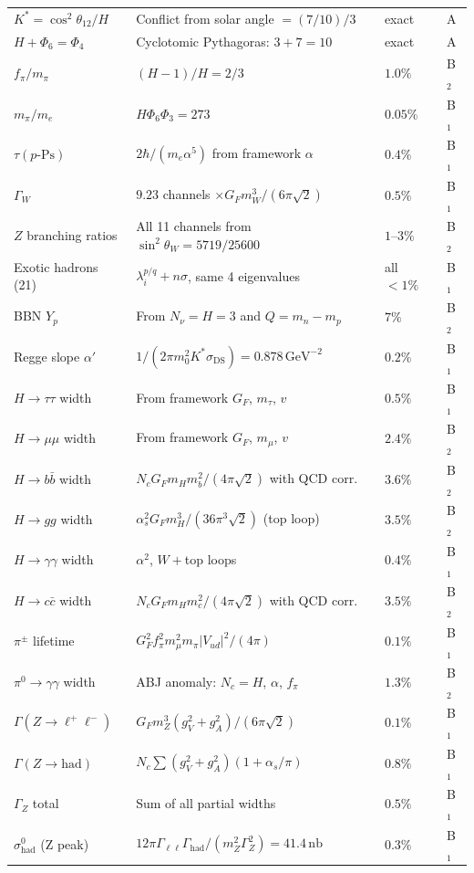 \documentclass[11pt,a4paper]{article}
\theoremstyle{definition}
\theoremstyle{remark}
\begin{document}
\begin{longtable}{p{3.8cm}p{7.2cm}p{3.0cm}l}
$K^*=\cos^2\theta_{12}/H$ & Conflict from solar angle $=(7/10)/3$ & exact & A \\
$H+\Phi_6=\Phi_4$ & Cyclotomic Pythagoras: $3+7=10$ & exact & A \\
$f_\pi/m_\pi$ & $(H-1)/H=2/3$ & $1.0\%$ & B$_2$ \\
$m_\pi/m_e$ & $H\Phi_6\Phi_3=273$ & $0.05\%$ & B$_1$ \\
$\tau(p\text{-Ps})$ & $2\hbar/(m_e\alpha^5)$ from framework $\alpha$ & $0.4\%$ & B$_1$ \\
$\Gamma_W$ & $9.23$ channels $\times G_Fm_W^3/(6\pi\sqrt{2})$ & $0.5\%$ & B$_1$ \\
$Z$ branching ratios & All 11 channels from $\sin^2\theta_W=5719/25600$ & $1$--$3\%$ & B$_2$ \\
Exotic hadrons (21) & $\lambda_i^{p/q}+n\sigma$, same 4 eigenvalues & all ${<}1\%$ & B$_1$ \\
BBN $Y_p$ & From $N_\nu=H=3$ and $Q=m_n-m_p$ & $7\%$ & B$_2$ \\
Regge slope $\alpha'$ & $1/(2\pi m_0^2 K^*\sigma_{\mathrm{DS}})=0.878\,\mathrm{GeV}^{-2}$ & $0.2\%$ & B$_1$ \\
$H\to\tau\tau$ width & From framework $G_F$, $m_\tau$, $v$ & $0.5\%$ & B$_1$ \\
$H\to\mu\mu$ width & From framework $G_F$, $m_\mu$, $v$ & $2.4\%$ & B$_2$ \\
$H\to b\bar{b}$ width & $N_c G_F m_H m_b^2/(4\pi\sqrt{2})$ with QCD corr. & $3.6\%$ & B$_2$ \\
$H\to gg$ width & $\alpha_s^2 G_F m_H^3/(36\pi^3\sqrt{2})$ (top loop) & $3.5\%$ & B$_2$ \\
$H\to\gamma\gamma$ width & $\alpha^2$, $W+$top loops & $0.4\%$ & B$_1$ \\
$H\to c\bar{c}$ width & $N_c G_F m_H m_c^2/(4\pi\sqrt{2})$ with QCD corr. & $3.5\%$ & B$_2$ \\
$\pi^\pm$ lifetime & $G_F^2 f_\pi^2 m_\mu^2 m_\pi |V_{ud}|^2/(4\pi)$ & $0.1\%$ & B$_1$ \\
$\pi^0\to\gamma\gamma$ width & ABJ anomaly: $N_c=H$, $\alpha$, $f_\pi$ & $1.3\%$ & B$_2$ \\
$\Gamma(Z\to\ell^+\ell^-)$ & $G_F m_Z^3(g_V^2+g_A^2)/(6\pi\sqrt{2})$ & $0.1\%$ & B$_1$ \\
$\Gamma(Z\to\mathrm{had})$ & $N_c\sum(g_V^2+g_A^2)(1+\alpha_s/\pi)$ & $0.8\%$ & B$_1$ \\
$\Gamma_Z$ total & Sum of all partial widths & $0.5\%$ & B$_1$ \\
$\sigma^0_\mathrm{had}$ (Z peak) & $12\pi\Gamma_{\ell\ell}\Gamma_\mathrm{had}/(m_Z^2\Gamma_Z^2)=41.4\,\mathrm{nb}$ & $0.3\%$ & B$_1$ \\

\end{longtable}
\end{document}
